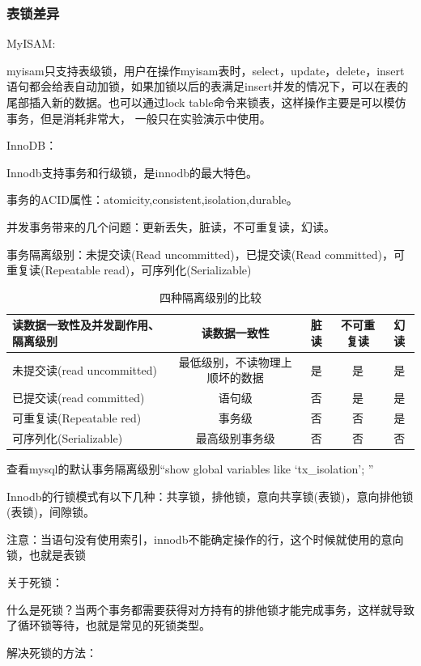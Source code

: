 \documentclass[UTF8]{ctexart}
\begin{document}
\subsubsection{表锁差异}
MyISAM:

myisam只支持表级锁，用户在操作myisam表时，select，update，delete，insert语句都会给表自动加锁，如果加锁以后的表满足insert并发的情况下，可以在表的尾部插入新的数据。也可以通过lock table命令来锁表，这样操作主要是可以模仿事务，但是消耗非常大，
一般只在实验演示中使用。

InnoDB：

Innodb支持事务和行级锁，是innodb的最大特色。

事务的ACID属性：atomicity,consistent,isolation,durable。

并发事务带来的几个问题：更新丢失，脏读，不可重复读，幻读。

事务隔离级别：未提交读(Read uncommitted)，已提交读(Read committed)，可重复读(Repeatable read)，可序列化(Serializable)

\begin{table}[]
    \caption{四种隔离级别的比较}
    \vspace{20pt}
    \centering
    \begin{tabular}{|l|c|c|c|c|}
        \hline
        读数据一致性及并发副作用、隔离级别&读数据一致性&脏读&不可重复读&幻读\\
        \hline
		未提交读(read uncommitted)&最低级别，不读物理上顺坏的数据&是&是&是\\
		已提交读(read committed)	&语句级&否&是&是\\
		可重复读(Repeatable red)	&事务级&否&否&是\\
		可序列化(Serializable)	&最高级别事务级&否&否&否\\
        \hline       
    \end{tabular}
    \label{bs02}
\end{table}

查看mysql的默认事务隔离级别“show global variables like ‘tx\_isolation’; ”

Innodb的行锁模式有以下几种：共享锁，排他锁，意向共享锁(表锁)，意向排他锁(表锁)，间隙锁。

注意：当语句没有使用索引，innodb不能确定操作的行，这个时候就使用的意向锁，也就是表锁

关于死锁：

什么是死锁？当两个事务都需要获得对方持有的排他锁才能完成事务，这样就导致了循环锁等待，也就是常见的死锁类型。

解决死锁的方法：
\end{document}
